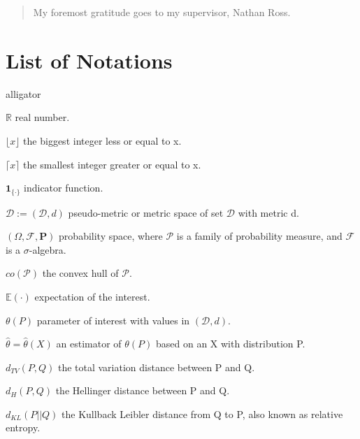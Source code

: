 \documentclass[12pt, a4paper,twoside]{report}
\theoremstyle{definition}
\theoremstyle{myplain}
\theoremstyle{mypro}
\begin{document}
\renewcommand{\abstractname}{Acknowledgments}
\begin{abstract}
My foremost gratitude goes to my supervisor, Nathan Ross.
\end{abstract}



\tableofcontents

\listoffigures

\chapter*{List of Notations}
\begin{labeling}{alligator}
\item [$\mathbb{R}$] real number.
\item [$\lfloor x \rfloor$] the biggest integer less or equal to x.
\item [$\lceil x \rceil$] the smallest integer greater or equal to x.
\item [$\textbf{1}_{\{\cdot\}}$] indicator function.
\item [$\mathcal{D}:=(\mathcal{D},d)$] pseudo-metric or metric space of set $\mathcal{D}$ with metric d.
\item [$(\Omega, \mathcal{F}, \textbf{P})$] probability space, where $\mathcal{P}$ is a family of probability measure, and $\mathcal{F}$ is a $\sigma$-algebra.
\item [$co(\mathcal{P})$] the convex hull of $\mathcal{P}$. 
\item [$\mathbb{E}(\cdot)$] expectation of the interest.
\item [$\theta(P)$] parameter of interest with values in $(\mathcal{D},d)$.
\item [$\hat{\theta}=\hat{\theta}(X)$] an estimator of $\theta(P)$ based on an X with distribution P.
\item [$d_{TV}(P, Q)$] the total variation distance between P and Q.
\item [$d_{H}(P,Q)$] the Hellinger distance between P and Q.
\item [$d_{KL}(P||Q)$] the Kullback Leibler distance from Q to P, also known as relative entropy.
\end{labeling}
\end{document}
